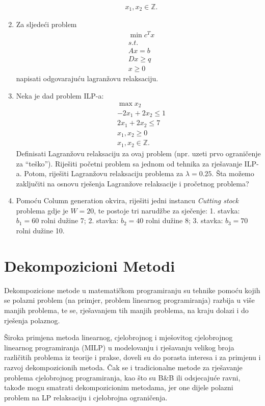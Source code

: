 \documentclass[a4paper, utf8, 11pt, colorlinks]{book}
\begin{document}
\begin{enumerate}
\begin{align*}
  	 & x_1, x_2\in \mathbb{Z}.
  \end{align*}
\item  Za sljedeći problem 
\begin{align*}
	&\min c^T x \\
	&s.t. \\
	& Ax = b \\
	& D x \geq q \\
	& x \geq 0
\end{align*}
napisati odgovarajuću lagranžovu relaksaciju. 
\item %
Neka je dad problem ILP-a:
\begin{align*}
	&\max x_2 \\
	& -2x_1 + 2x_2 \leq 1 \\
	& 2 x_1 + 2 x_2 \leq 7 \\
	& x_1, x_2 \geq 0 \\
	& x_1, x_2 \in \mathbb{Z}.
\end{align*}
Definisati Lagranžovu relaksaciju za ovaj problem (npr. uzeti prvo ograničenje za ``teško''). Riješiti početni problem sa jednom od tehnika za rješavanje ILP-a. Potom, riješiti Lagranžovu relaksaciju problema za $\lambda=0.25$. Šta možemo zaključiti na osnovu rješenja Lagranžove relaksacije i pročetnog problema? 
\item   Pomoću Column generation okvira, riješiti jedni instancu \emph{Cutting stock} problema gdje je  
$W = 20$, te postoje tri narudžbe za sječenje: 1. stavka: $b_1=60$ rolni dužine 7; 2. stavka: $b_2=40$ rolni dužine 8; 3. stavka: $b_3=70$ rolni dužine 10. 

 \end{enumerate}
 
 \newpage
 
 \chapter{Dekompozicioni Metodi}
 
Dekompozicione metode u matematičkom programiranju su tehnike pomoću kojih se polazni problem (na primjer, problem linearnog programiranja) razbija u više manjih problema, te se, rješavanjem tih manjih problema, na kraju dolazi i do rješenja polaznog.

Široka primjena metoda linearnog, cjelobrojnog i mješovitog cjelobrojnog linearnog programiranja (MILP) u modelovanju i rješavanju velikog broja različitih problema iz teorije i prakse, doveli su do porasta interesa i za primjenu i razvoj dekompozicionih metoda. Čak se i tradicionalne metode za rješavanje problema cjelobrojnog programiranja, kao što su B\&B  ili odsjecajuće ravni, takođe   mogu smatrati dekompozicionim metodama, jer one dijele polazni problem na LP relaksaciju i cjelobrojna ograničenja.
\end{document}
